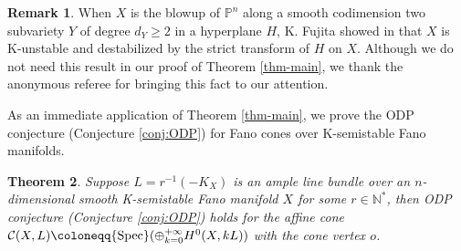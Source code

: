 \documentclass[12pt]{amsart}
\newtheorem{thm}{Theorem}[section]
\theoremstyle{definition}
\newtheorem{rmk}[thm]{Remark}
\def\spec{{\rm Spec}}
\newcommand{\IN}{{\mathbb N}}
\newcommand{\IP}{{\mathbb P}}
\newcommand{\CC}{{\mathcal C}}
\begin{document}
\begin{rmk}
    When $X$ is the blowup of $\IP^n$ along a smooth codimension two subvariety $Y$ of degree $d_Y\geq 2$ in a hyperplane $H$, K. Fujita showed in \cite[Lemma 9.7]{Fuj16} that $X$ is K-unstable and destabilized by the strict transform of $H$ on $X$. Although we do not need this result in our proof of Theorem \ref{thm-main}, we thank the anonymous referee for bringing this fact to our attention.
\end{rmk}
As an immediate application of Theorem \ref{thm-main}, we prove the ODP conjecture (Conjecture \ref{conj:ODP}) for Fano cones over K-semistable Fano manifolds.  
\begin{thm}\label{cor:ODPregular}
    Suppose $L = r^{-1}(-K_X)$ is an ample line bundle over an $n$-dimensional smooth K-semistable  Fano manifold $X$ for some $r\in \IN^*$, then ODP conjecture (Conjecture \ref{conj:ODP}) holds for the affine cone $\CC(X,L)\coloneqq \spec(\oplus_{k=0}^{+\infty}H^0(X,kL))$ with the cone vertex $o$.
\end{thm}
\end{document}
